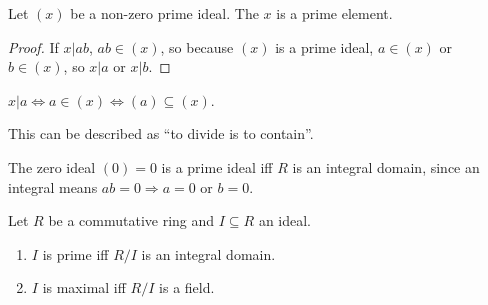 \begin{lemma}
	Let $(x)$ be a non-zero prime ideal. The $x$ is a prime element.
\end{lemma}

\begin{proof}
	If $x | ab$, $ab \in (x)$, so because $(x)$ is a prime ideal, $a \in (x)$ or $b \in (x)$, so $x | a$ or $x | b$.
\end{proof}

\begin{remark}
	$x | a \Leftrightarrow a \in (x) \Leftrightarrow (a) \subseteq (x)$.

	This can be described as ``to divide is to contain''.
\end{remark}

\begin{corollary}
	The zero ideal $(0) = 0$ is a prime ideal iff $R$ is an integral domain, since an integral means $ab = 0 \Rightarrow a = 0 \text{ or } b = 0$.
\end{corollary}

\begin{theorem}
	Let $R$ be a commutative ring and $I \subseteq R$ an ideal.

	\begin{enumerate}
		\item $I$ is prime iff $R / I$ is an integral domain.
		\item $I$ is maximal iff $R / I$ is a field.
	\end{enumerate}
\end{theorem}

